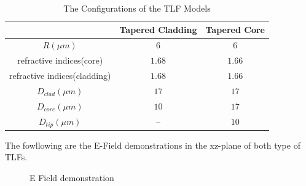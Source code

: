 \begin{table}
\begin{tabular}{ccc}
\hline
							&Tapered Cladding&Tapered Core\\
\hline
$R(\mu m)$ & $6$						 &$6$	\\
refractive indices(core)&$1.68$&$1.66$\\
refractive indices(cladding)&$1.68$&$1.66$\\
$D_{clad}(\mu m)$ &	$17$ &	$17$\\
$D_{core}(\mu m)$ & $10$ &	$17$\\
$D_{tip}(\mu m)$  & --   &	$10$\\
\hline
\end{tabular}
\caption{The Configurations of the TLF Models}
\label{tab:model_fiber_configuration}
\end{table}
The fowllowing are the E-Field demonstrations in the xz-plane of both type of TLFs.
\begin{figure}
	\hfill
	\caption{E Field demonstration}
\end{figure}




